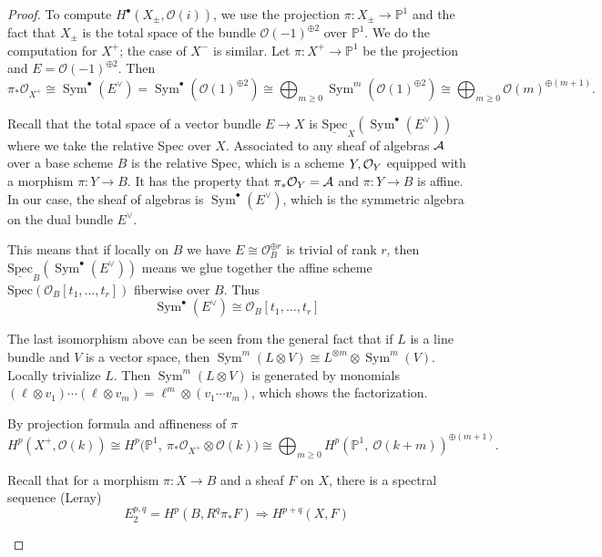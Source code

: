 \documentclass[12pt]{article}
\begin{document}
\begin{proof}
To compute $H^\bullet(X_\pm,\mathcal{O}(i))$, we use the projection $\pi:X_\pm\to\mathbb{P}^1$ and the fact that $X_\pm$ is the total space of the bundle $\mathcal{O}(-1)^{\oplus 2}$ over $\mathbb{P}^1$. We do the computation for $X^+$; the case of $X^-$ is similar. Let $\pi:X^+\to \mathbb{P}^1$ be the projection and $E=\mathcal{O}(-1)^{\oplus 2}$. Then
\[
  \pi_*\mathcal{O}_{X^+}\cong\operatorname{Sym}^\bullet(E^\vee)
  =\operatorname{Sym}^\bullet(\mathcal{O}(1)^{\oplus 2})
  \cong\bigoplus_{m\ge0}\operatorname{Sym}^m(\mathcal{O}(1)^{\oplus 2})
  \cong\bigoplus_{m\ge0}\mathcal{O}(m)^{\oplus (m+1)}.
\]

\begin{remark}
  Recall that the total space of a vector bundle $E\to X$ is $\underline{\mathrm{Spec}}_X(\operatorname{Sym}^\bullet(E^\vee))$ where we take the relative Spec over $X$. Associated to any sheaf of algebras ${\mathcal{A}}$ over a base scheme $B$ is the relative Spec, which is a scheme $Y,{\mathcal{O}}_Y$ equipped with a morphism $\pi:Y\to B$. It has the property that $\pi_*{\mathcal{O}}_Y={\mathcal{A}}$ and $\pi:Y\to B$ is affine. In our case, the sheaf of algebras is $\operatorname{Sym}^\bullet(E^\vee)$, which is the symmetric algebra on the dual bundle $E^\vee$.

  This means that if locally on $B$ we have $E \cong \mathcal{O}_B^{\oplus r}$ is trivial of rank $r$, then  $\underline{\mathrm{Spec}}_B(\operatorname{Sym}^\bullet(E^\vee))$ means we glue together the affine scheme $\mathrm{Spec}(\mathcal{O}_B[t_1,\dots,t_r])$ fiberwise over $B$. Thus \[\operatorname{Sym}^\bullet(E^\vee) \cong \mathcal{O}_B[t_1,\dots,t_r]\]

  The last isomorphism above can be seen from the general fact that if $L$ is a line bundle and $V$ is a vector space, then $\operatorname{Sym}^m(L\otimes V) \cong L^{\otimes m}\otimes \operatorname{Sym}^m(V)$. Locally trivialize $L$. Then $\operatorname{Sym}^m(L\otimes V)$ is generated by monomials $(\ell\otimes v_1)\cdots (\ell\otimes v_m) = \ell^m \otimes (v_1\cdots v_m)$, which shows the factorization.
\end{remark}

By projection formula and affineness of $\pi$ \[
  H^p(X^+,\mathcal{O}(k))
  \cong
  H^p\Big(\mathbb{P}^1,\ \pi_*\mathcal{O}_{X^+}\otimes\mathcal{O}(k)\Big)
  \cong
  \bigoplus_{m\ge0} H^p(\mathbb{P}^1,\ \mathcal{O}(k+m))^{\oplus (m+1)}.
\]

\begin{remark}
  Recall that for a morphism $\pi:X\to B$ and a sheaf $F$ on $X$, there is a spectral sequence (Leray) \[E_2^{p,q} = H^p(B, R^q\pi_*F) \Longrightarrow H^{p+q}(X,F)\]


\end{remark}
\end{proof}
\end{document}

